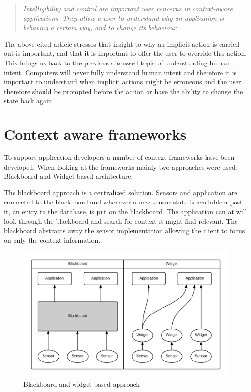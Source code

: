 \documentclass[../report.tex]{subfiles}
\begin{document}
\blockquote{\textit{Intelligibility and control are important user concerns in context-aware applications. They allow a user to understand why an application is behaving a certain way, and to change its behaviour.}} \cite{Dey and Newberger (2009)}

The above cited article stresses that insight to why an implicit action is carried out is important, and that it is important to offer the user to override this action. This brings us back to the previous discussed topic of understanding human intent. Computers will never fully understand human intent and therefore it is important to understand when implicit actions might be erroneous and the user therefore should be prompted before the action or have the ability to change the state back again.

\section{Context aware frameworks}
To support application developers a number of context-frameworks have been developed. When looking at the frameworks mainly two approaches were used: Blackboard and Widget-based architecture.

The blackboard approach is a centralized solution. Sensors and application are connected to the blackboard and whenever a new sensor state is available a post-it, an entry to the database, is put on the blackboard. The application can at will look through the blackboard and search for context it might find relevant. The blackboard abstracts away the sensor implementation allowing the client to focus on only the context information. 

\begin{figure}
\centering
\includegraphics[width=\linewidth]{blackboard-widget.png}
\caption{Blackboard and widget-based approach}
\label{fig:blackboard-widget}
\end{figure}
\end{document}
